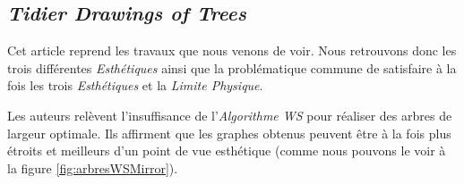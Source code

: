 \documentclass{article}
\begin{document}
\newpage
  \subsection{\emph{Tidier Drawings of Trees}}

  Cet article \cite{article81} reprend les travaux que nous venons de voir. Nous retrouvons donc les trois différentes \emph{Esthétiques} ainsi que la problématique commune de satisfaire à la fois les trois \emph{Esthétiques} et la \emph{Limite Physique}.

  Les auteurs relèvent l'insuffisance de l'\emph{Algorithme WS} pour réaliser des arbres de largeur optimale. Ils affirment que les graphes obtenus peuvent être à la fois plus étroits et meilleurs d'un point de vue esthétique (comme nous pouvons le voir à la figure \ref{fig:arbresWSMirror}).
\end{document}
